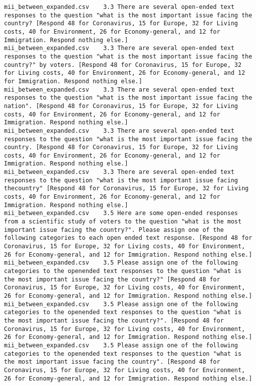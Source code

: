 \begin{lstlisting}[label=lst:promptvariants]
mii_between_expanded.csv	3.3	There are several open-ended text responses to the question "what is the most important issue facing the country? [Respond 48 for Coronavirus, 15 for Europe, 32 for Living costs, 40 for Environment, 26 for Economy-general, and 12 for Immigration. Respond nothing else.]
mii_between_expanded.csv	3.3	There are several open-ended text responses to the question "what is the most important issue facing the country?" by voters. [Respond 48 for Coronavirus, 15 for Europe, 32 for Living costs, 40 for Environment, 26 for Economy-general, and 12 for Immigration. Respond nothing else.]
mii_between_expanded.csv	3.3	There are several open-ended text responses to the question "what is the most important issue facing the nation". [Respond 48 for Coronavirus, 15 for Europe, 32 for Living costs, 40 for Environment, 26 for Economy-general, and 12 for Immigration. Respond nothing else.]
mii_between_expanded.csv	3.3	There are several open-ended text responses to the question "what is the most important issue facing the country. [Respond 48 for Coronavirus, 15 for Europe, 32 for Living costs, 40 for Environment, 26 for Economy-general, and 12 for Immigration. Respond nothing else.]
mii_between_expanded.csv	3.3	There are several open-ended text responses to the question "what is the most important issue facing thecountry" [Respond 48 for Coronavirus, 15 for Europe, 32 for Living costs, 40 for Environment, 26 for Economy-general, and 12 for Immigration. Respond nothing else.]
mii_between_expanded.csv	3.5	Here are some open-ended responses from a scientific study of voters to the question "what is the most important issue facing the country?". Please assign one of the following categories to each open ended text response. [Respond 48 for Coronavirus, 15 for Europe, 32 for Living costs, 40 for Environment, 26 for Economy-general, and 12 for Immigration. Respond nothing else.]
mii_between_expanded.csv	3.5	Please assign one of the following categories to the openended text responses to the question "what is the most important issue facing the country?" [Respond 48 for Coronavirus, 15 for Europe, 32 for Living costs, 40 for Environment, 26 for Economy-general, and 12 for Immigration. Respond nothing else.]
mii_between_expanded.csv	3.5	Please assign one of the following categories to the openended text responses to the question "what is the most important issue facing the country?". [Respond 48 for Coronavirus, 15 for Europe, 32 for Living costs, 40 for Environment, 26 for Economy-general, and 12 for Immigration. Respond nothing else.]
mii_between_expanded.csv	3.5	Please assign one of the following categories to the openended text responses to the question "what is the most important issue facing the country". [Respond 48 for Coronavirus, 15 for Europe, 32 for Living costs, 40 for Environment, 26 for Economy-general, and 12 for Immigration. Respond nothing else.]

\end{lstlisting}
